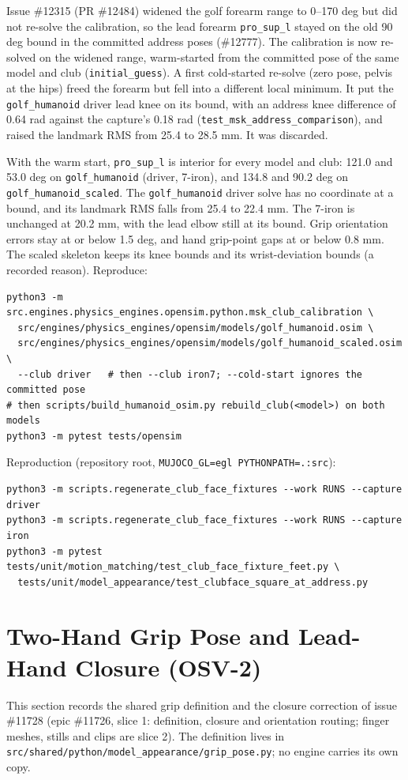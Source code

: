 \documentclass[11pt,a4paper]{article}
\begin{document}
Issue \#12315 (PR \#12484) widened the golf forearm range to 0--170 deg but
did not re-solve the calibration, so the lead forearm \texttt{pro\_sup\_l}
stayed on the old 90 deg bound in the committed address poses (\#12777). The
calibration is now re-solved on the widened range, warm-started from the
committed pose of the same model and club (\texttt{initial\_guess}).
A first cold-started re-solve (zero pose, pelvis at the hips) freed the
forearm but fell into a different local minimum. It put the
\texttt{golf\_humanoid} driver lead knee on its bound, with an address knee
difference of 0.64 rad against the capture's 0.18 rad
(\texttt{test\_msk\_address\_comparison}), and raised the landmark RMS from
25.4 to 28.5 mm. It was discarded.

With the warm start, \texttt{pro\_sup\_l} is interior for every model and
club: 121.0 and 53.0 deg on \texttt{golf\_humanoid} (driver, 7-iron), and
134.8 and 90.2 deg on \texttt{golf\_humanoid\_scaled}. The
\texttt{golf\_humanoid} driver solve has no coordinate at a bound, and its
landmark RMS falls from 25.4 to 22.4 mm. The 7-iron is unchanged at
20.2 mm, with the lead elbow still at its bound. Grip orientation errors stay
at or below 1.5 deg, and hand grip-point gaps at or below 0.8 mm. The scaled
skeleton keeps its knee bounds and its wrist-deviation bounds (a recorded
reason). Reproduce:
\begin{verbatim}
python3 -m src.engines.physics_engines.opensim.python.msk_club_calibration \
  src/engines/physics_engines/opensim/models/golf_humanoid.osim \
  src/engines/physics_engines/opensim/models/golf_humanoid_scaled.osim \
  --club driver   # then --club iron7; --cold-start ignores the committed pose
# then scripts/build_humanoid_osim.py rebuild_club(<model>) on both models
python3 -m pytest tests/opensim
\end{verbatim}

Reproduction (repository root, \texttt{MUJOCO\_GL=egl PYTHONPATH=.:src}):
\begin{verbatim}
python3 -m scripts.regenerate_club_face_fixtures --work RUNS --capture driver
python3 -m scripts.regenerate_club_face_fixtures --work RUNS --capture iron
python3 -m pytest tests/unit/motion_matching/test_club_face_fixture_feet.py \
  tests/unit/model_appearance/test_clubface_square_at_address.py
\end{verbatim}

\section{Two-Hand Grip Pose and Lead-Hand Closure (OSV-2)}
This section records the shared grip definition and the closure correction of
issue \#11728 (epic \#11726, slice 1: definition, closure and orientation
routing; finger meshes, stills and clips are slice 2). The definition lives in
\texttt{src/shared/python/model\_appearance/grip\_pose.py}; no engine carries
its own copy.
\end{document}
